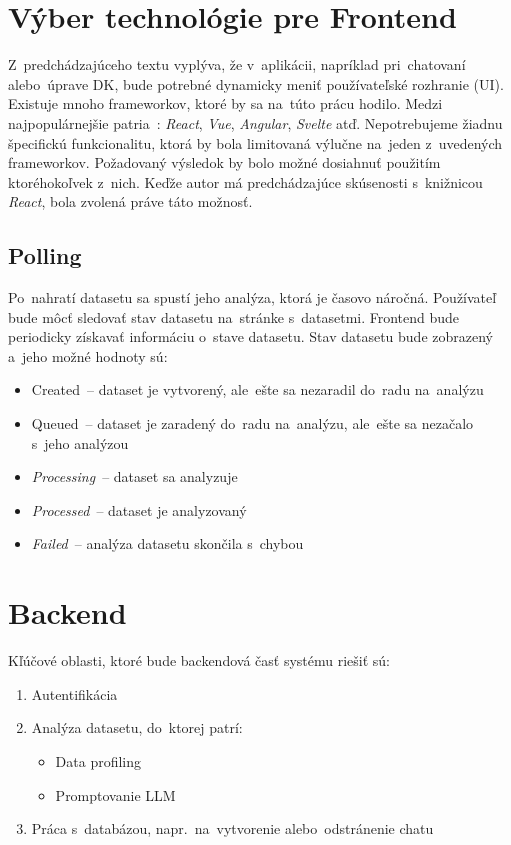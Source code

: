 \section{Výber technológie pre Frontend}

Z~predchádzajúceho textu vyplýva, že v~aplikácii, napríklad pri~chatovaní alebo~úprave DK, bude potrebné dynamicky meniť používateľské rozhranie (UI). Existuje mnoho frameworkov, ktoré by sa na~túto prácu hodilo. Medzi najpopulárnejšie patria~\cite{popular-frontend-frameworks}: \textit{React}, \textit{Vue}, \textit{Angular}, \textit{Svelte} atď. Nepotrebujeme žiadnu špecifickú funkcionalitu, ktorá by bola limitovaná výlučne na~jeden z~uvedených frameworkov. Požadovaný výsledok by bolo možné dosiahnuť použitím ktoréhokoľvek z~nich. Keďže autor má predchádzajúce skúsenosti s~knižnicou \textit{React}, bola zvolená práve táto možnosť.

\subsection{Polling}

Po~nahratí datasetu sa spustí jeho analýza, ktorá je časovo náročná. Používateľ bude môcť sledovať stav datasetu na~stránke s~datasetmi. Frontend bude periodicky získavať informáciu o~stave datasetu. Stav datasetu bude zobrazený a~jeho možné hodnoty sú:
\begin{itemize}
\item Created~-- dataset je vytvorený, ale~ešte sa nezaradil do~radu na~analýzu
\item Queued~-- dataset je zaradený do~radu na~analýzu, ale~ešte sa nezačalo s~jeho analýzou
\item \textit{Processing}~-- dataset sa analyzuje
\item \textit{Processed}~-- dataset je analyzovaný
\item \textit{Failed}~-- analýza datasetu skončila s~chybou
\end{itemize}

\section{Backend}

Kľúčové oblasti, ktoré bude backendová časť systému riešiť sú:
\begin{enumerate}
\item Autentifikácia
\item Analýza datasetu, do~ktorej patrí:
\begin{itemize}
\item Data profiling
\item Promptovanie LLM
\end{itemize}
\item Práca s~databázou, napr.~na~vytvorenie alebo~odstránenie chatu
\end{enumerate}

